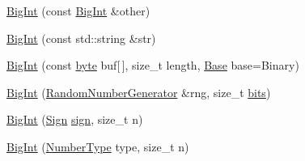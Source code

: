 \begin{DoxyCompactItemize}
\hyperlink{classBotan_1_1BigInt_ad2b43b16aa01a204f54fee8ab8a5044a}{Big\-Int} (const \hyperlink{classBotan_1_1BigInt}{Big\-Int} \&other)
\item 
\hyperlink{classBotan_1_1BigInt_af8557c8149ed3e90caf1f144a12567e4}{Big\-Int} (const std\-::string \&str)
\item 
\hyperlink{classBotan_1_1BigInt_a6afd4a1efd873b59da7b71a2e07d4205}{Big\-Int} (const \hyperlink{namespaceBotan_a7d793989d801281df48c6b19616b8b84}{byte} buf\mbox{[}$\,$\mbox{]}, size\-\_\-t length, \hyperlink{classBotan_1_1BigInt_a2f432a3a957f2e25c78af361ab662a23}{Base} base=Binary)
\item 
\hyperlink{classBotan_1_1BigInt_a22ff2ce9b5ca817975a606fa265d7e26}{Big\-Int} (\hyperlink{classBotan_1_1RandomNumberGenerator}{Random\-Number\-Generator} \&rng, size\-\_\-t \hyperlink{classBotan_1_1BigInt_a8d564c135af2ab5e65f7b634773727c4}{bits})
\item 
\hyperlink{classBotan_1_1BigInt_aee035b333eea1a57c22add38de625f47}{Big\-Int} (\hyperlink{classBotan_1_1BigInt_ad4cc39c2c247db669ac07e5501dbf84d}{Sign} \hyperlink{classBotan_1_1BigInt_a0a2e903bb0bb3b65e1a399ad52999e91}{sign}, size\-\_\-t n)
\item 
\hyperlink{classBotan_1_1BigInt_a23fadadbb81c19590762dcd01c9c226b}{Big\-Int} (\hyperlink{classBotan_1_1BigInt_a04e15539ce23aadc724b1be759873341}{Number\-Type} type, size\-\_\-t n)
\end{DoxyCompactItemize}
